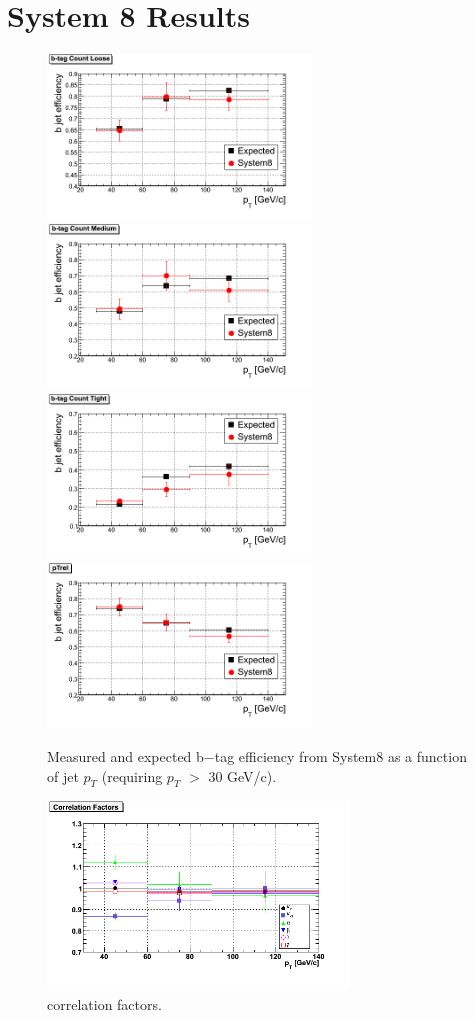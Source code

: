 \section{System 8 Results}
\begin{figure}[htbp]
  \begin{center}
    \includegraphics[width=70mm]{Figures/TCL_Tag.png}
    \includegraphics[width=70mm]{Figures/TCM_Tag.png}
    \includegraphics[width=70mm]{Figures/TCT_Tag.png}
    \includegraphics[width=70mm]{Figures/pTrel.png}
  \end{center}
  \caption{Measured and expected b$-$tag efficiency from System8 as a function of jet $p_T $ (requiring $p_T $ $> $ 30 GeV/c).}
  \label{fig:S8_results}
\end{figure}


\begin{figure}[htbp]
  \begin{center}
    \includegraphics[width=80mm]{Figures/TCM_correlations_ppmux.png}
  \end{center}
  \caption{correlation factors.}
  \label{fig:correlation}
\end{figure}
